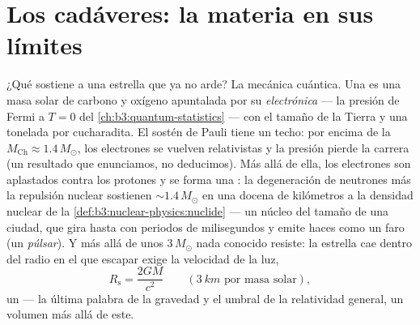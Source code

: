 \section{Los cadáveres: la materia en sus límites}

\begin{proposition}\label{prop:b3:astrophysics:compact}
¿Qué sostiene a una estrella que ya no arde? La mecánica cuántica. Una
\emph{} es una masa solar de carbono y oxígeno apuntalada
por su \emph{ electrónica} --- la presión de Fermi
a $T = 0$ del \cref{ch:b3:quantum-statistics} --- con el tamaño
de la Tierra y una tonelada por cucharadita. El sostén de Pauli tiene un
techo: por encima de la \emph{} $M_{\text{Ch}}
\approx 1.4\,M_\odot$, los electrones se vuelven relativistas y la
presión pierde la carrera (un resultado que enunciamos, no deducimos). Más allá
de ella, los electrones son aplastados contra los protones y se forma una \emph{}: la degeneración de neutrones más la repulsión nuclear sostienen
$\sim1.4\,M_\odot$ en una docena de kilómetros a la densidad nuclear de la
\cref{def:b3:nuclear-physics:nuclide} --- un
núcleo del tamaño de una ciudad, que gira hasta con periodos de milisegundos y emite haces como
un faro (un \emph{púlsar}). Y más allá de unos $3\,M_\odot$
nada conocido resiste: la estrella cae dentro del radio en el que
escapar exige la velocidad de la luz,
\[
R_{\text{s}} = \frac{2GM}{c^2}
\qquad (\qty{3}{km}\text{ por masa solar}) ,
\]
un \emph{} --- la última palabra de la gravedad y el
umbral de la relatividad general, un volumen más allá de este.
\end{proposition}
\admitted

